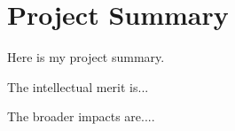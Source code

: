 
\section*{Project Summary}
\renewcommand{\thepage} {A--\arabic{page}}

Here is my project summary. 

  The intellectual merit is...

  The broader impacts are....


